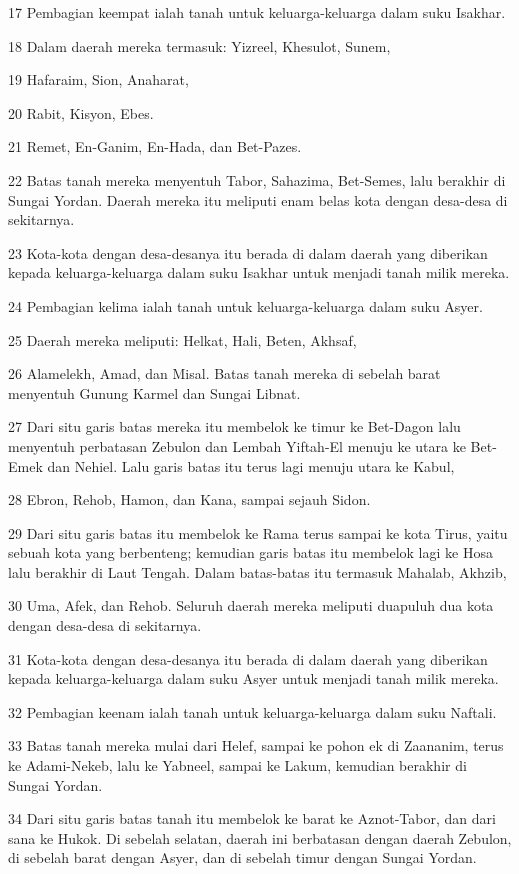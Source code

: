 \par 17 Pembagian keempat ialah tanah untuk keluarga-keluarga dalam suku Isakhar.
\par 18 Dalam daerah mereka termasuk: Yizreel, Khesulot, Sunem,
\par 19 Hafaraim, Sion, Anaharat,
\par 20 Rabit, Kisyon, Ebes.
\par 21 Remet, En-Ganim, En-Hada, dan Bet-Pazes.
\par 22 Batas tanah mereka menyentuh Tabor, Sahazima, Bet-Semes, lalu berakhir di Sungai Yordan. Daerah mereka itu meliputi enam belas kota dengan desa-desa di sekitarnya.
\par 23 Kota-kota dengan desa-desanya itu berada di dalam daerah yang diberikan kepada keluarga-keluarga dalam suku Isakhar untuk menjadi tanah milik mereka.
\par 24 Pembagian kelima ialah tanah untuk keluarga-keluarga dalam suku Asyer.
\par 25 Daerah mereka meliputi: Helkat, Hali, Beten, Akhsaf,
\par 26 Alamelekh, Amad, dan Misal. Batas tanah mereka di sebelah barat menyentuh Gunung Karmel dan Sungai Libnat.
\par 27 Dari situ garis batas mereka itu membelok ke timur ke Bet-Dagon lalu menyentuh perbatasan Zebulon dan Lembah Yiftah-El menuju ke utara ke Bet-Emek dan Nehiel. Lalu garis batas itu terus lagi menuju utara ke Kabul,
\par 28 Ebron, Rehob, Hamon, dan Kana, sampai sejauh Sidon.
\par 29 Dari situ garis batas itu membelok ke Rama terus sampai ke kota Tirus, yaitu sebuah kota yang berbenteng; kemudian garis batas itu membelok lagi ke Hosa lalu berakhir di Laut Tengah. Dalam batas-batas itu termasuk Mahalab, Akhzib,
\par 30 Uma, Afek, dan Rehob. Seluruh daerah mereka meliputi duapuluh dua kota dengan desa-desa di sekitarnya.
\par 31 Kota-kota dengan desa-desanya itu berada di dalam daerah yang diberikan kepada keluarga-keluarga dalam suku Asyer untuk menjadi tanah milik mereka.
\par 32 Pembagian keenam ialah tanah untuk keluarga-keluarga dalam suku Naftali.
\par 33 Batas tanah mereka mulai dari Helef, sampai ke pohon ek di Zaananim, terus ke Adami-Nekeb, lalu ke Yabneel, sampai ke Lakum, kemudian berakhir di Sungai Yordan.
\par 34 Dari situ garis batas tanah itu membelok ke barat ke Aznot-Tabor, dan dari sana ke Hukok. Di sebelah selatan, daerah ini berbatasan dengan daerah Zebulon, di sebelah barat dengan Asyer, dan di sebelah timur dengan Sungai Yordan.
